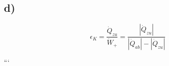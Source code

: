 

\subsection*{d)}

\[
\epsilon_K = \frac{\dot{Q}_{zu}}{\dot{W}_{+}} = \frac{|\dot{Q}_{zu}|}{|\dot{Q}_{ab}| - |\dot{Q}_{zu}|}
\]

```